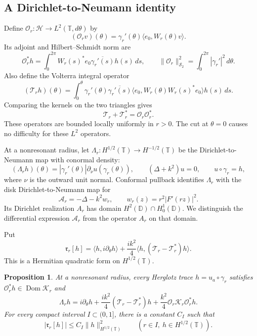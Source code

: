 \documentclass[11pt]{amsart}
\numberwithin{equation}{section}
\newtheorem{proposition}[theorem]{Proposition}
\newcommand{\D}{\mathbb D}
\newcommand{\T}{\mathbb T}
\newcommand{\Hh}{\mathcal H}
\newcommand{\Dom}{\operatorname{Dom}}
\newcommand{\ip}[2]{\langle #1,#2\rangle}
\newcommand{\norm}[1]{\lVert #1\rVert}
\newcommand{\OO}{\mathcal O}
\newcommand{\VV}{\mathcal T}
\newcommand{\KK}{\mathcal K}
\begin{document}
\subsection{A Dirichlet-to-Neumann identity}

Define $\OO_r:\Hh\to L^2(\T,d\theta)$ by
\[
 (\OO_rv)(\theta)=\gamma_r'(\theta)\ip{e_0}{W_r(\theta)v}.
\]
Its adjoint and Hilbert--Schmidt norm are
\begin{equation}\label{eq:Ostar}
 \OO_r^*h=\int_0^{2\pi}W_r(s)^*e_0\overline{\gamma_r'(s)}h(s)\,ds,
 \qquad \norm{\OO_r}_{\mathcal S_2}^2
       =\int_0^{2\pi}|\gamma_r'|^2\,d\theta.
\end{equation}
Also define the Volterra integral operator
\[
 (\VV_rh)(\theta)=\int_0^\theta
 \gamma_r'(\theta)\overline{\gamma_r'(s)}
 \ip{e_0}{W_r(\theta)W_r(s)^*e_0}h(s)\,ds.
\]
Comparing the kernels on the two triangles gives
\begin{equation}\label{eq:Volterra}
 \VV_r+\VV_r^*=\OO_r\OO_r^*.
\end{equation}
These operators are bounded locally uniformly in $r>0$.
The cut at $\theta=0$ causes no difficulty for these $L^2$ operators.

At a nonresonant radius, let
$\Lambda_r:H^{1/2}(\T)\to H^{-1/2}(\T)$ be the
Dirichlet-to-Neumann map with conormal density:
\[
 (\Lambda_rh)(\theta)=|\gamma_r'(\theta)|
       \partial_\nu u(\gamma_r(\theta)),\qquad
 (\Delta+k^2)u=0,\qquad u\circ\gamma_r=h,
\]
where $\nu$ is the outward unit normal.
Conformal pullback identifies $\Lambda_r$ with the disk
Dirichlet-to-Neumann map for
\begin{equation}\label{eq:Ar}
 \mathscr A_r=-\Delta-k^2w_r,\qquad
 w_r(z)=r^2|F'(rz)|^2.
\end{equation}
Its Dirichlet realization $A_r$ has domain
$H^2(\D)\cap H_0^1(\D)$. We distinguish the differential expression
$\mathscr A_r$ from the operator $A_r$ on that domain.

Put
\[
 \mathfrak r_r[h]=\ip h{i\partial_\theta h}
       +\frac{ik^2}{4}\ip h{(\VV_r-\VV_r^*)h}.
\]
This is a Hermitian quadratic form on $H^{1/2}(\T)$.

\begin{proposition}\label{prop:identity}
At a nonresonant radius, every Herglotz trace $h=u_a\circ\gamma_r$
satisfies $\OO_r^*h\in\Dom\KK_r$ and
\begin{equation}\label{eq:identity}
 \Lambda_rh=i\partial_\theta h
       +\frac{ik^2}{4}(\VV_r-\VV_r^*)h
       +\frac{k^2}{4}\OO_r\KK_r\OO_r^*h.
\end{equation}
For every compact interval $I\subset(0,1]$, there is a constant
$C_I$ such that
\begin{equation}\label{eq:remainder}
 |\mathfrak r_r[h]|\le C_I\norm h_{H^{1/2}(\T)}^2
       \qquad(r\in I,\ h\in H^{1/2}(\T)).
\end{equation}
\end{proposition}
\end{document}
